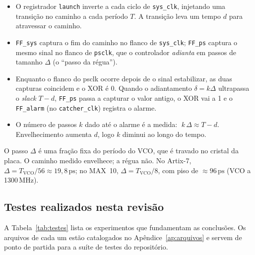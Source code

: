 \documentclass[11pt,a4paper]{article}
\newcommand{\ps}{\ensuremath{\,\mathrm{ps}}\xspace}
\newcommand{\MHz}{\ensuremath{\,\mathrm{MHz}}\xspace}
\begin{document}
\begin{itemize}
  \item O registrador \texttt{launch} inverte a cada ciclo de \texttt{sys\_clk}, injetando
        uma transição no caminho a cada período $T$. A transição leva um tempo $d$ para
        atravessar o caminho.
  \item \texttt{FF\_sys} captura o fim do caminho no flanco de \texttt{sys\_clk}; \texttt{FF\_ps}
        captura o mesmo sinal no flanco de \texttt{psclk}, que o controlador \emph{adianta} em
        passos de tamanho $\Delta$ (o ``passo da régua'').
  \item Enquanto o flanco do psclk ocorre depois de o sinal estabilizar, as duas capturas
        coincidem e o XOR é 0. Quando o adiantamento $\delta = k\Delta$ ultrapassa o
        \emph{slack} $T-d$, \texttt{FF\_ps} passa a capturar o valor antigo, o XOR vai a 1
        e o \texttt{FF\_alarm} (no \texttt{catcher\_clk}) registra o alarme.
  \item O número de passos $k$ dado até o alarme é a medida:
        $\;k\,\Delta \approx T - d$. Envelhecimento aumenta $d$, logo $k$ diminui ao longo
        do tempo.
\end{itemize}

\begin{keybox}[title={Por que a régua é confiável}]
O passo $\Delta$ é uma fração fixa do período do VCO, que é travado no cristal da placa.
O caminho medido envelhece; a régua não. No Artix-7, $\Delta = T_\text{VCO}/56 \approx 19{,}8\ps$;
no MAX~10, $\Delta = T_\text{VCO}/8$, com piso de $\approx 96\ps$ (VCO a 1300\MHz).
\end{keybox}

\subsection{Testes realizados nesta revisão}

A Tabela~\ref{tab:testes} lista os experimentos que fundamentam as conclusões. Os arquivos
de cada um estão catalogados no Apêndice~\ref{ap:arquivos} e servem de ponto de partida para
a suíte de testes do repositório.
\end{document}
